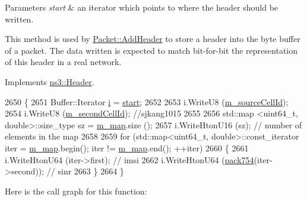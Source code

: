 \begin{DoxyParams}{Parameters}
{\em start} & an iterator which points to where the header should be written.\\
\hline
\end{DoxyParams}
This method is used by \hyperlink{classns3_1_1Packet_a465108c595a0bc592095cbcab1832ed8}{Packet\+::\+Add\+Header} to store a header into the byte buffer of a packet. The data written is expected to match bit-\/for-\/bit the representation of this header in a real network. 

Implements \hyperlink{classns3_1_1Header_afb61f1aac69ff8349a6bfe521fab5404}{ns3\+::\+Header}.


\begin{DoxyCode}
2650 \{
2651   Buffer::Iterator \hyperlink{bernuolliDistribution_8m_a6f6ccfcf58b31cb6412107d9d5281426}{i} = \hyperlink{namespacevisualizer_1_1core_a2a35e5d8a34af358b508dac8635754e0}{start};
2652 
2653   i.WriteU8 (\hyperlink{classns3_1_1EpcX2UeImsiSinrUpdateHeader_a501240ac9c8dd81e9f1dff3719c98a2e}{m\_sourceCellId});
2654   i.WriteU8 (\hyperlink{classns3_1_1EpcX2UeImsiSinrUpdateHeader_add66214d31be980761eb2a0cdd3687a0}{m\_secondCellId}); \textcolor{comment}{//sjkang1015}
2655 
2656   std::map <uint64\_t, double>::size\_type sz = \hyperlink{classns3_1_1EpcX2UeImsiSinrUpdateHeader_a917c27de3e79840fbbc85bd72d538519}{m\_map}.size ();
2657   i.WriteHtonU16 (sz);              \textcolor{comment}{// number of elements in the map}
2658 
2659   \textcolor{keywordflow}{for} (std::map<uint64\_t, double>::const\_iterator iter = \hyperlink{classns3_1_1EpcX2UeImsiSinrUpdateHeader_a917c27de3e79840fbbc85bd72d538519}{m\_map}.begin(); iter != 
      \hyperlink{classns3_1_1EpcX2UeImsiSinrUpdateHeader_a917c27de3e79840fbbc85bd72d538519}{m\_map}.end(); ++iter)
2660     \{
2661       i.WriteHtonU64 (iter->first); \textcolor{comment}{// imsi}
2662       i.WriteHtonU64 (\hyperlink{classns3_1_1EpcX2UeImsiSinrUpdateHeader_abdc3f7d5eb846a7bab844952daa4db10}{pack754}(iter->second)); \textcolor{comment}{// sinr}
2663     \}
2664 \}
\end{DoxyCode}


Here is the call graph for this function\+:


